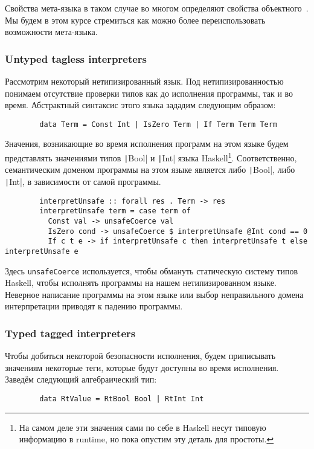 \documentclass[12pt]{article}
\begin{document}
    Свойства мета-языка в таком случае во многом определяют свойства объектного~\cite{reynolds1972definitional,reynolds1998definitional}.
    Мы будем в этом курсе стремиться как можно более переиспользовать возможности мета-языка.

    \subsubsection{Untyped tagless interpreters}

    Рассмотрим некоторый нетипизированный язык.
    Под нетипизированностью понимаем отсутствие проверки типов как до исполнения программы, так и во время.
    Абстрактный синтаксис этого языка зададим следующим образом:
    \begin{verbatim}
        data Term = Const Int | IsZero Term | If Term Term Term
    \end{verbatim}

    Значения, возникающие во время исполнения программ на этом языке будем представлять значениями типов \texttt|Bool| и \texttt|Int| языка Haskell\footnote{На самом деле эти значения сами по себе в Haskell несут типовую информацию в runtime, но пока опустим эту деталь для простоты.}.
    Соответственно, семантическим доменом программы на этом языке является либо \texttt|Bool|, либо \texttt|Int|, в зависимости от самой программы.
    \begin{verbatim}
        interpretUnsafe :: forall res . Term -> res
        interpretUnsafe term = case term of
          Const val -> unsafeCoerce val
          IsZero cond -> unsafeCoerce $ interpretUnsafe @Int cond == 0
          If c t e -> if interpretUnsafe c then interpretUnsafe t else interpretUnsafe e
    \end{verbatim}

    Здесь \texttt{unsafeCoerce} используется, чтобы обмануть статическую систему типов Haskell, чтобы исполнять программы на нашем нетипизированном языке.
    Неверное написание программы на этом языке или выбор неправильного домена интерпретации приводят к падению программы.

    \subsubsection{Typed tagged interpreters}

    Чтобы добиться некоторой безопасности исполнения, будем приписывать значениям некоторые теги, которые будут доступны во время исполнения.
    Заведём следующий алгебраический тип:
    \begin{verbatim}
        data RtValue = RtBool Bool | RtInt Int
    \end{verbatim}
\end{document}
